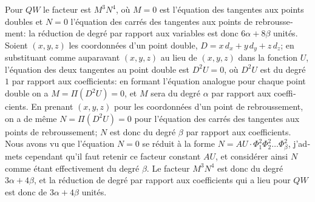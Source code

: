 \documentclass[11pt,a4paper]{article}
\begin{document}
\begin{otherlanguage}{french}
Pour $QW$ le facteur est $M^{3}N^{4}$, o\`u $M = 0$ est l'\'equation des tangentes aux points doubles et $N = 0$ l'\'equation des carr\'es des tangentes aux points de rebroussement: la r\'eduction de degr\'e par rapport aux variables est donc $6\alpha + 8\beta$ unit\'es. Soient $(x, y, z)$ les coordonn\'ees d'un point double, $D = x\,d_{x} + y\,d_{y} + z\,d_{z}$; en substituant comme auparavant $(x, y, z)$ au lieu de $(x, y, z)$ dans la fonction $U$, l'\'equation des deux tangentes au point double est $D^{2}U = 0$, o\`u $D^{2}U$ est du degr\'e $1$ par rapport aux coefficients: en formant l'\'equation analogue pour chaque point double on a $M = \Pi(D^{2}U) = 0$, et $M$ sera du degr\'e $\alpha$ par rapport aux coefficients. En prenant $(x, y, z)$ pour les coordonn\'ees d'un point de rebroussement, on a de m\^eme $N = \Pi(D^{2}U) = 0$ pour l'\'equation des carr\'es des tangentes aux points de rebroussement; $N$ est donc du degr\'e $\beta$ par rapport aux coefficients. Nous avons vu que l'\'equation $N = 0$ se r\'eduit \`a la forme $N = AU \cdot \Phi_{1}^{2}\Phi_{2}^{2}\ldots\Phi_{\beta}^{2}$, j'admets cependant qu'il faut retenir ce facteur constant $AU$, et consid\'erer ainsi $N$ comme \'etant effectivement du degr\'e $\beta$. Le facteur $M^{3}N^{4}$ est donc du degr\'e $3\alpha + 4\beta$, et la r\'eduction de degr\'e par rapport aux coefficients qui a lieu pour $QW$ est donc de $3\alpha + 4\beta$ unit\'es.


\end{otherlanguage}
\end{document}
